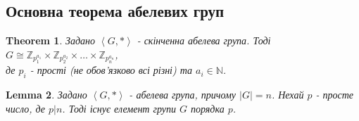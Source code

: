 \documentclass[a4paper, 10pt]{article}
\theoremstyle{theoremdd}
\newtheorem{theorem}{Theorem}[subsection]
\theoremstyle{theoremdd}
\theoremstyle{theoremdd}
\theoremstyle{theoremdd}
\theoremstyle{theoremdd}
\theoremstyle{theoremdd}
\theoremstyle{theoremdd}
\theoremstyle{theoremdd}
\theoremstyle{theoremdd}
\theoremstyle{theoremdd}
\theoremstyle{theoremdd}
\theoremstyle{theoremdd}
\theoremstyle{theoremdd}
\newtheorem{lemma}[theorem]{Lemma}
\theoremstyle{theoremdd}
\theoremstyle{theoremdd}
\begin{document}
\iffalse
\subsection{Основна теорема абелевих груп}
\begin{theorem}
Задано $\left< G, * \right>$ - скінченна абелева група. Тоді\\
$G \cong \mathbb{Z}_{p_1^{a_1}} \times \mathbb{Z}_{p_2^{a_2}} \times \dots \times \mathbb{Z}_{p_n^{a_n}}$,\\
де $p_i$ - прості (не обов'язково всі різні) та $a_i \in \mathbb{N}$.
\end{theorem}

\begin{lemma}
Задано $\left< G, * \right>$ - абелева група, причому $|G| = n$. Нехай $p$ - просте число, де $p| n $. Тоді існує елемент групи $G$ порядка $p$.
\end{lemma}
\end{document}
